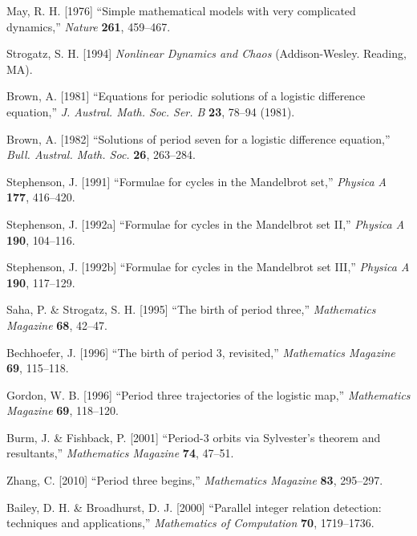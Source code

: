 \documentclass{ws-ijbc}
\begin{document}
\begin{thebibliography}{50}


  May, R. H. [1976]
  ``Simple mathematical models with very complicated dynamics,''
  {\it Nature}
  \textbf{261},
  459--467.

  Strogatz, S. H. [1994]
  {\it Nonlinear Dynamics and Chaos}
  (Addison-Wesley. Reading, MA).

  Brown, A. [1981]
  ``Equations for periodic solutions of a logistic difference equation,''
  {\it J. Austral. Math. Soc. Ser. B}
  \textbf{23},
  78--94
  (1981).

  Brown, A. [1982]
  ``Solutions of period seven for a logistic difference equation,''
  {\it Bull. Austral. Math. Soc.}
  \textbf{26},
  263--284.

  Stephenson, J. [1991]
  ``Formulae for cycles in the Mandelbrot set,''
  {\it Physica A}
  \textbf{177},
  416--420.

  Stephenson, J. [1992a]
  ``Formulae for cycles in the Mandelbrot set II,''
  {\it Physica A}
  \textbf{190},
  104--116.

  Stephenson, J. [1992b]
  ``Formulae for cycles in the Mandelbrot set III,''
  {\it Physica A}
  \textbf{190},
  117--129.

  Saha, P. \& Strogatz, S. H. [1995]
  ``The birth of period three,''
  {\it Mathematics Magazine}
  \textbf{68},
  42--47.

  Bechhoefer, J. [1996]
  ``The birth of period 3, revisited,''
  {\it Mathematics Magazine}
  \textbf{69},
  115--118.

  Gordon, W. B. [1996]
  ``Period three trajectories of the logistic map,''
  {\it Mathematics Magazine}
  \textbf{69},
  118--120.

  Burm, J. \& Fishback, P. [2001]
  ``Period-3 orbits via Sylvester's theorem and resultants,''
  {\it Mathematics Magazine}
  \textbf{74},
  47--51.

  Zhang, C. [2010]
  ``Period three begins,''
  {\it Mathematics Magazine}
  \textbf{83},
  295--297.

  Bailey, D. H. \& Broadhurst, D. J. [2000]
  ``Parallel integer relation detection: techniques and applications,''
  {\it Mathematics of Computation}
  \textbf{70},
  1719--1736.


\end{thebibliography}
\end{document}
